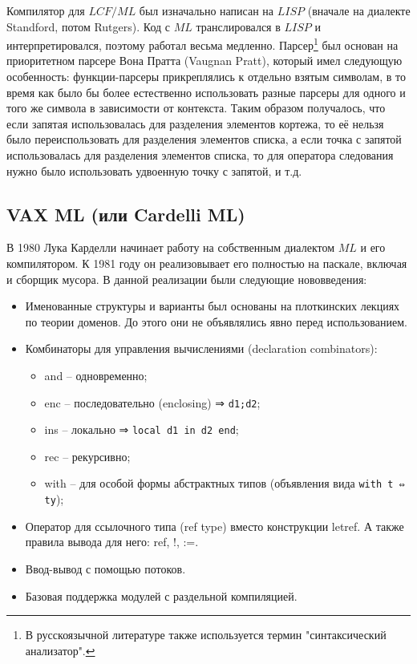 \documentclass[14pt]{matmex-diploma-custom}
\begin{document}
Компилятор для $LCF/ML$ был изначально написан на $LISP$ (вначале на диалекте Standford, потом Rutgers). Код с $M\!L$ транслировался в $LISP$ и интерпретировался, поэтому работал весьма медленно. Парсер\footnote{В русскоязычной литературе также используется термин "синтаксический анализатор".} был основан на приоритетном парсере Вона Пратта (Vaugnan Pratt), который имел следующую особенность: функции-парсеры прикреплялись к отдельно взятым символам, в то время как было бы более естественно использовать разные парсеры для одного и того же символа в зависимости от контекста. Таким образом получалось, что если запятая использовалась для разделения элементов кортежа, то её нельзя было переиспользовать для разделения элементов списка, а если точка с запятой использовалась для разделения элементов списка, то для оператора следования нужно было использовать удвоенную точку с запятой, и т.д.

\subsection{VAX ML (или Cardelli ML)}
В 1980 Лука Карделли начинает работу на собственным диалектом $M\!L$ и его компилятором. К 1981 году он реализовывает его полностью на паскале, включая и сборщик мусора. В данной реализации были следующие нововведения:
\begin{itemize}	
\item Именованные структуры и варианты был основаны на плоткинских лекциях по теории доменов. До этого они не объявлялись явно перед использованием.
\item Комбинаторы для управления вычислениями (declaration combinators):
      \begin{itemize}
	\item and -- одновременно;
	\item enc -- последовательно (enclosing)  ⇒ \verb=d1;d2=;
	\item ins -- локально  ⇒ \verb=local d1 in d2 end=;
	\item rec -- рекурсивно;
	\item with -- для особой формы абстрактных типов (объявления вида \verb=with t ⇔ ty=);
      \end{itemize}
\item Оператор для ссылочного типа (ref type) вместо конструкции letref. А также правила вывода для него: ref, !, :=.
\item Ввод-вывод с помощью потоков.
\item Базовая поддержка модулей с раздельной компиляцией.
\end{itemize}
\end{document}

